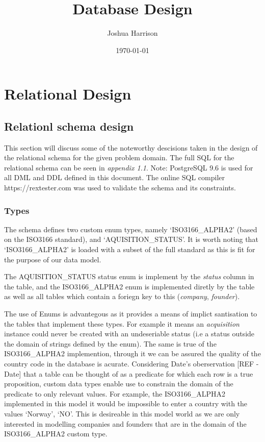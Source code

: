 \documentclass[12pt]{article}
\title{Database Design}
\author{Joshua Harrison}
\date{\today}
\begin{document}
\maketitle

\section{Relational Design}

\subsection{Relationl schema design}
This section will discuss some of the noteworthy descisions taken in the design of the relational schema for the given problem domain.
The full SQL for the relational schema can be seen in \emph{appendix 1.1}. Note: PostgreSQL 9.6 is used for all DML and DDL defined in this document. The online SQL compiler https://rextester.com was used to validate the schema and its constraints.

\subsubsection{Types}
The schema defines two custom enum types, namely  `ISO3166\_ALPHA2' (based on the ISO3166 standard), and `AQUISITION\_STATUS'. It is worth noting that `ISO3166\_ALPHA2' is loaded with a subset of the full standard as this is fit for the purpose of our data model.

The AQUISITION\_STATUS status enum is implement by the \emph{status} column in the  table, and the ISO3166\_ALPHA2 enum is implemented diretly by the  table as well as all tables which contain a foriegn key to this (\emph{company}, \emph{founder}).

The use of Enums is advantegous as it provides a means of implict santisation to the tables that implement these types. For example it means an \emph{acquisition} instance could never be created with an undeseriable status (i.e a status outside the domain of strings defined by the enum). The same is true of the ISO3166\_ALPHA2 implemention, through it we can be assured the quality of the country code in the database is acurate. Considering Date's  oberservation [REF - Date] that a table can be thought of as a predicate for which each row is a true proposition, custom data types enable use to constrain the domain of the predicate to only relevant values. For example, the ISO3166\_ALPHA2 implemented in this model it would be impossible to enter a country with the values `Norway', `NO'. This is desireable in this model world as we are only interested in modelling companies and founders that are in the domain of the ISO3166\_ALPHA2 custom type.
\end{document}
